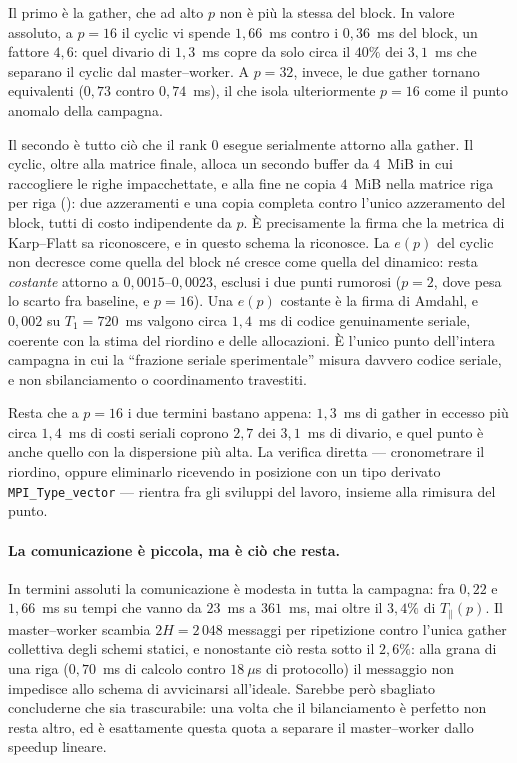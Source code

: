 Il primo è la gather, che ad alto $p$ non è più la stessa del block. In valore
assoluto, a $p=16$ il cyclic vi spende $1{,}66$~ms contro i $0{,}36$~ms del
block, un fattore $4{,}6$: quel divario di $1{,}3$~ms copre da solo circa il
$40\%$ dei $3{,}1$~ms che separano il cyclic dal master--worker. A $p=32$,
invece, le due gather tornano equivalenti ($0{,}73$ contro $0{,}74$~ms), il che
isola ulteriormente $p=16$ come il punto anomalo della campagna.

Il secondo è tutto ciò che il rank $0$ esegue serialmente attorno alla gather. Il
cyclic, oltre alla matrice finale, alloca un secondo buffer da $4$~MiB in cui
raccogliere le righe impacchettate, e alla fine ne copia $4$~MiB nella matrice
riga per riga (): due azzeramenti e
una copia completa contro l'unico azzeramento del block, tutti di costo
indipendente da $p$. È precisamente la firma che la metrica di Karp--Flatt sa
riconoscere, e in questo schema la riconosce. La $e(p)$ del cyclic non decresce
come quella del block né cresce come quella del dinamico: resta \emph{costante}
attorno a $0{,}0015$--$0{,}0023$, esclusi i due punti rumorosi ($p=2$, dove pesa
lo scarto fra baseline, e $p=16$). Una $e(p)$ costante è la firma di Amdahl, e
$0{,}002$ su $T_1 = 720$~ms valgono circa $1{,}4$~ms di codice genuinamente
seriale, coerente con la stima del riordino e delle allocazioni. È l'unico punto
dell'intera campagna in cui la ``frazione seriale sperimentale'' misura davvero
codice seriale, e non sbilanciamento o coordinamento travestiti.

Resta che a $p=16$ i due termini bastano appena: $1{,}3$~ms di gather in eccesso
più circa $1{,}4$~ms di costi seriali coprono $2{,}7$ dei $3{,}1$~ms di divario,
e quel punto è anche quello con la dispersione più alta. La verifica diretta ---
cronometrare il riordino, oppure eliminarlo ricevendo in posizione con un tipo
derivato \texttt{MPI\_Type\_vector} --- rientra fra gli sviluppi del lavoro,
insieme alla rimisura del punto.

\paragraph{La comunicazione è piccola, ma è ciò che resta.}
In termini assoluti la comunicazione è modesta in tutta la campagna: fra
$0{,}22$ e $1{,}66$~ms su tempi che vanno da $23$~ms a $361$~ms, mai oltre il
$3{,}4\%$ di $T_\parallel(p)$. Il master--worker scambia $2H = 2\,048$ messaggi
per ripetizione contro l'unica gather collettiva degli schemi statici, e
nonostante ciò resta sotto il $2{,}6\%$: alla grana di una riga ($0{,}70$~ms di
calcolo contro $18~\mu$s di protocollo) il messaggio non impedisce allo schema
di avvicinarsi all'ideale. Sarebbe però sbagliato concluderne che sia
trascurabile: una volta che il bilanciamento è perfetto non resta altro, ed è
esattamente questa quota a separare il master--worker dallo speedup lineare.

